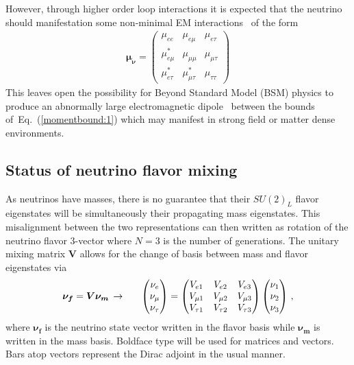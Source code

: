 \documentclass[a4paper]{article}
\newcommand*{\bb}{\boldsymbol}
\newcommand{\req}[1]{Eq.~(\ref{#1})}
\begin{document}
However, through higher order loop interactions it is expected that the neutrino should manifestation some non-minimal EM interactions~\citep{Shrock:1980vy,DUNE:2020fgq} of the form
\begin{gather}
    \bb{\mu_{\nu}}=
	\begin{pmatrix}
		\mu_{ee} & \mu_{e\mu} & \mu_{e\tau} \\
		\mu_{e\mu}^{*} & \mu_{\mu\mu} & \mu_{\mu\tau} \\
		\mu_{e\tau}^{*} & \mu_{\mu\tau}^{*} & \mu_{\tau\tau}
	\end{pmatrix}
\end{gather}
This leaves open the possibility for Beyond Standard Model (BSM) physics to produce an abnormally large electromagnetic dipole~\citep{Giunti:2014ixa,Lindner:2017uvt,Brdar:2020quo} between the bounds of~\req{momentbound:1} which may manifest in strong field or matter dense environments.

\subsection{Status of neutrino flavor mixing}
\label{sec:numass}
\noindent As neutrinos have masses, there is no guarantee that their $SU(2)_{L}$ flavor eigenstates will be simultaneously their propagating mass eigenstates. This misalignment between the two representations can then written as rotation of the neutrino flavor 3-vector where $N=3$ is the number of generations. The unitary mixing matrix $\bb{V}$ allows for the change of basis between mass and flavor eigenstates via
\begin{alignat}{1}
	\label{basis:1} \bb{\nu_{f}}=\bb{V}\bb{\nu_{m}}\,\rightarrow\indent
	\begin{pmatrix}
		\nu_{e}\\
		\nu_{\mu}\\
		\nu_{\tau}
	\end{pmatrix}=
	\begin{pmatrix}
		V_{e1} & V_{e2} & V_{e3}\\
		V_{\mu1} & V_{\mu2} & V_{\mu3}\\
		V_{\tau1} & V_{\tau2} & V_{\tau3}
	\end{pmatrix}
	\begin{pmatrix}
		\nu_{1}\\
		\nu_{2}\\
		\nu_{3}
	\end{pmatrix}\,,
\end{alignat}
where $\bb{\nu_{f}}$ is the neutrino state vector written in the flavor basis while $\bb{\nu_{m}}$ is written in the mass basis. Boldface type will be used for matrices and vectors. Bars atop vectors represent the Dirac adjoint in the usual manner.
\end{document}
